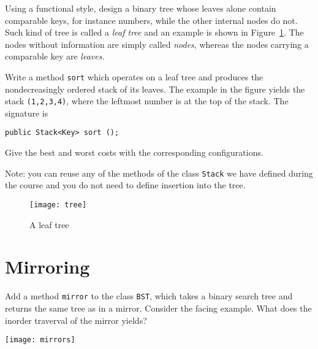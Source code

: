 \documentclass[11pt,a4paper]{article}
\begin{document}
Using a functional style, design a binary tree whose leaves alone
contain comparable keys, for instance numbers, while the other
internal nodes do not. Such kind of tree is called a \emph{leaf tree}
and an example is shown in Figure~\ref{fig:leaf_tree}. The nodes
without information are simply called \emph{nodes}, whereas the nodes
carrying a comparable key are \emph{leaves}.

Write a method \texttt{sort} which operates on a leaf tree and
produces the nondecreasingly ordered stack of its leaves. The example
in the figure yields the stack \texttt{(1,2,3,4)}, where the
leftmost number is at the top of the stack. The signature is
\begin{verbatim}
public Stack<Key> sort ();
\end{verbatim}
Give the best and worst costs with the corresponding configurations.

Note: you can reuse any of the methods of the class \texttt{Stack} we
have defined during the course and you do not need to define insertion
into the tree.
\begin{figure}[h]
\centering
\texttt{[image: tree]}
\caption{A leaf tree\label{fig:leaf_tree}}
\end{figure}

\section{Mirroring}

\begin{multicols}{2}
Add a method \texttt{mirror} to the class \texttt{BST}, which takes a
binary search tree and returns the same tree as in a mirror. Consider
the facing example. What does the inorder traverval of the mirror
yields?
\par\vfill\columnbreak
\begin{center}
\texttt{[image: mirrors]}
\end{center}
\end{multicols}
\end{document}
